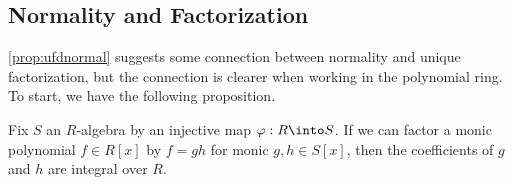 
\subsection{Normality and Factorization}
\autoref{prop:ufdnormal} suggests some connection between normality and unique factorization, but the connection is clearer when working in the polynomial ring. To start, we have the following proposition.
\begin{proposition}
	Fix $S$ an $R$-algebra by an injective map $\varphi:R\into S$. If we can factor a monic polynomial $f\in R[x]$ by $f=gh$ for monic $g,h\in S[x]$, then the coefficients of $g$ and $h$ are integral over $R$.
\end{proposition}
